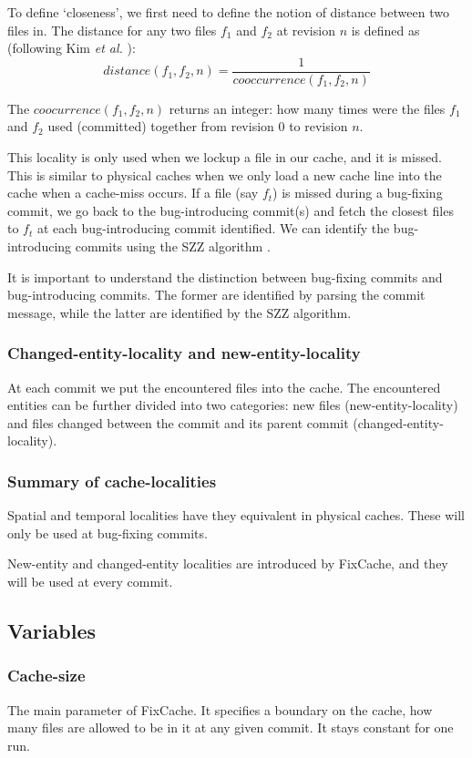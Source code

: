 \documentclass[12pt,twoside,notitlepage]{report}
\newcommand{\fxch}{FixCache}
\newcommand{\etal}{\textit{et al.}}
\begin{document}
To define `closeness', we first need to define the notion of distance between two files in. The distance  for any two files $f_1$ and $f_2$ at revision $n$ is defined as (following Kim \etal{} \cite{FixCache}):
\vspace{0.2in}
\[
	distance(f_1, f_2, n) = \frac{1}{cooccurrence(f_1, f_2, n)}
\]

\vspace{0.2in}
The $coocurrence(f_1, f_2, n)$ returns an integer: how many times were the files $f_1$ and $f_2$ used (committed) together from revision $0$ to revision $n$.

This locality is only used when we lockup a file in our cache, and it is missed. This is similar to physical caches when we only load a new cache line into the cache when a cache-miss occurs. If a file (say $f_t$) is missed during a bug-fixing commit, we go back to the bug-introducing commit(s) and fetch the closest files to $f_t$ at each bug-introducing commit identified. We can identify the bug-introducing commits using the SZZ algorithm \cite{SZZ}.

It is important to understand the distinction between bug-fixing commits and bug-introducing commits. The former are identified by parsing the commit message, while the latter are identified by the SZZ algorithm.

\subsubsection{Changed-entity-locality and new-entity-locality}
At each commit we put the encountered files into the cache. The encountered entities can be further divided into two categories: new files (new-entity-locality) and files changed between the commit and its parent commit (changed-entity-locality).
\subsubsection{Summary of cache-localities}
Spatial and temporal localities have they equivalent in physical caches. These will only be used at bug-fixing commits.

New-entity and changed-entity localities are introduced by \fxch{}, and they will be used at every commit.
\subsection{Variables}\label{variables}
\subsubsection{Cache-size}
The main parameter of \fxch{}. It specifies a boundary on the cache, how many files are allowed to be in it at any given commit. It stays constant for one run.
\end{document}
